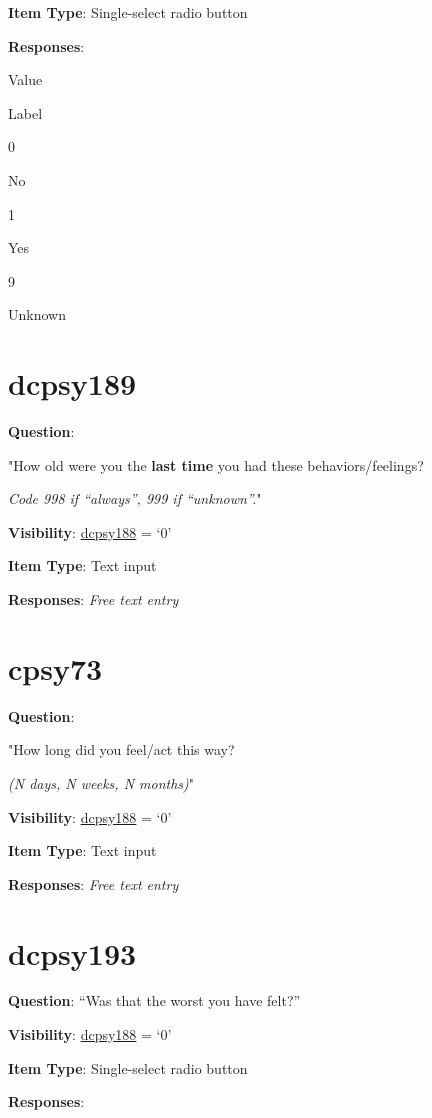 \documentclass[]{book}
\begin{document}
\textbf{Item Type}: Single-select radio button

\textbf{Responses}:

Value

Label

0

No

1

Yes

9

Unknown

\hypertarget{dcpsy189}{%
\section{dcpsy189}\label{dcpsy189}}

\textbf{Question}:

"How old were you the \textbf{last time} you had these behaviors/feelings?

\emph{Code 998 if ``always'', 999 if ``unknown''.}"

\textbf{Visibility}: \protect\hyperlink{dcpsy188}{dcpsy188} = `0'

\textbf{Item Type}: Text input

\textbf{Responses}: \emph{Free text entry}

\hypertarget{cpsy73}{%
\section{cpsy73}\label{cpsy73}}

\textbf{Question}:

"How long did you feel/act this way?

\emph{(N days, N weeks, N months)}"

\textbf{Visibility}: \protect\hyperlink{dcpsy188}{dcpsy188} = `0'

\textbf{Item Type}: Text input

\textbf{Responses}: \emph{Free text entry}

\hypertarget{dcpsy193}{%
\section{dcpsy193}\label{dcpsy193}}

\textbf{Question}: ``Was that the worst you have felt?''

\textbf{Visibility}: \protect\hyperlink{dcpsy188}{dcpsy188} = `0'

\textbf{Item Type}: Single-select radio button

\textbf{Responses}:
\end{document}
